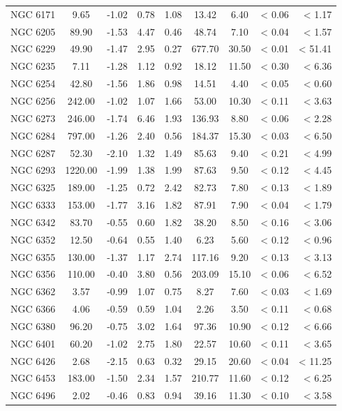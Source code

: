 \documentclass[doublespace,nopageskip]{VTthesis} %
\begin{document}
\begin{appendices}
\begin{center}
\begin{longtable}{lcccccccr}
NGC 6171 & 9.65 & -1.02 & 0.78 & 1.08 & 13.42 & 6.40 & < 0.06 & < 1.17\\
NGC 6205 & 89.90 & -1.53 & 4.47 & 0.46 & 48.74 & 7.10 & < 0.04 & < 1.57\\
NGC 6229 & 49.90 & -1.47 & 2.95 & 0.27 & 677.70 & 30.50 & < 0.01 & < 51.41\\
NGC 6235 & 7.11 & -1.28 & 1.12 & 0.92 & 18.12 & 11.50 & < 0.30 & < 6.36\\
NGC 6254 & 42.80 & -1.56 & 1.86 & 0.98 & 14.51 & 4.40 & < 0.05 & < 0.60\\
NGC 6256 & 242.00 & -1.02 & 1.07 & 1.66 & 53.00 & 10.30 & < 0.11 & < 3.63\\
NGC 6273 & 246.00 & -1.74 & 6.46 & 1.93 & 136.93 & 8.80 & < 0.06 & < 2.28\\
NGC 6284 & 797.00 & -1.26 & 2.40 & 0.56 & 184.37 & 15.30 & < 0.03 & < 6.50\\
NGC 6287 & 52.30 & -2.10 & 1.32 & 1.49 & 85.63 & 9.40 & < 0.21 & < 4.99\\
NGC 6293 & 1220.00 & -1.99 & 1.38 & 1.99 & 87.63 & 9.50 & < 0.12 & < 4.45\\
NGC 6325 & 189.00 & -1.25 & 0.72 & 2.42 & 82.73 & 7.80 & < 0.13 & < 1.89\\
NGC 6333 & 153.00 & -1.77 & 3.16 & 1.82 & 87.91 & 7.90 & < 0.04 & < 1.79\\
NGC 6342 & 83.70 & -0.55 & 0.60 & 1.82 & 38.20 & 8.50 & < 0.16 & < 3.06\\
NGC 6352 & 12.50 & -0.64 & 0.55 & 1.40 & 6.23 & 5.60 & < 0.12 & < 0.96\\
NGC 6355 & 130.00 & -1.37 & 1.17 & 2.74 & 117.16 & 9.20 & < 0.13 & < 3.13\\
NGC 6356 & 110.00 & -0.40 & 3.80 & 0.56 & 203.09 & 15.10 & < 0.06 & < 6.52\\
NGC 6362 & 3.57 & -0.99 & 1.07 & 0.75 & 8.27 & 7.60 & < 0.03 & < 1.69\\
NGC 6366 & 4.06 & -0.59 & 0.59 & 1.04 & 2.26 & 3.50 & < 0.11 & < 0.68\\
NGC 6380 & 96.20 & -0.75 & 3.02 & 1.64 & 97.36 & 10.90 & < 0.12 & < 6.66\\
NGC 6401 & 60.20 & -1.02 & 2.75 & 1.80 & 22.57 & 10.60 & < 0.11 & < 3.65\\
NGC 6426 & 2.68 & -2.15 & 0.63 & 0.32 & 29.15 & 20.60 & < 0.04 & < 11.25\\
NGC 6453 & 183.00 & -1.50 & 2.34 & 1.57 & 210.77 & 11.60 & < 0.12 & < 6.25\\
NGC 6496 & 2.02 & -0.46 & 0.83 & 0.94 & 39.16 & 11.30 & < 0.10 & < 3.58\\

\end{longtable}
\end{center}
\end{appendices}
\end{document}
